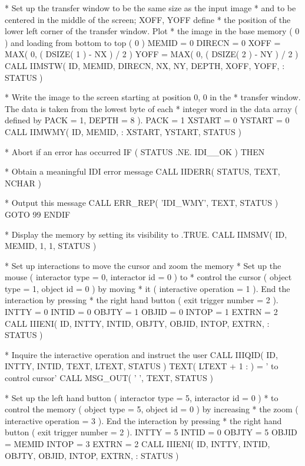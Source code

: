 \documentclass[11pt,nolof]{starlink}
\begin{document}
\begin{small}
\begin{terminalv}
*   Set up the transfer window to be the same size as the input image
*   and to be centered in the middle of the screen; XOFF, YOFF define
*   the position of the lower left corner of the transfer window. Plot
*   the image in the base memory ( 0 ) and loading from bottom to top ( 0 )
      MEMID = 0
      DIRECN = 0
      XOFF = MAX( 0, ( DSIZE( 1 ) - NX ) / 2 )
      YOFF = MAX( 0, ( DSIZE( 2 ) - NY ) / 2 )
      CALL IIMSTW( ID, MEMID, DIRECN, NX, NY, DEPTH, XOFF, YOFF,
     :             STATUS )

*   Write the image to the screen starting at position 0, 0 in the
*   transfer window. The data is taken from the lowest byte of each
*   integer word in the data array ( defined by PACK = 1, DEPTH = 8 ).
      PACK = 1
      XSTART = 0
      YSTART = 0
      CALL IIMWMY( ID, MEMID, %
     :             XSTART, YSTART, STATUS )

*   Abort if an error has occurred
      IF ( STATUS .NE. IDI__OK ) THEN

*   Obtain a meaningful IDI error message
         CALL IIDERR( STATUS, TEXT, NCHAR )

*   Output this message
         CALL ERR_REP( 'IDI_WMY', TEXT, STATUS )
         GOTO 99
      ENDIF

*   Display the memory by setting its visibility to .TRUE.
      CALL IIMSMV( ID, MEMID, 1, 1, STATUS )

*   Set up interactions to move the cursor and zoom the memory
*   Set up the mouse ( interactor type = 0, interactor id = 0 ) to
*   control the cursor ( object type = 1, object id = 0 ) by moving
*   it ( interactive operation = 1 ). End the interaction by pressing
*   the right hand button ( exit trigger number = 2 ).
      INTTY = 0
      INTID = 0
      OBJTY = 1
      OBJID = 0
      INTOP = 1
      EXTRN = 2
      CALL IIIENI( ID, INTTY, INTID, OBJTY, OBJID, INTOP, EXTRN,
     :             STATUS )

*   Inquire the interactive operation and instruct the user
      CALL IIIQID( ID, INTTY, INTID, TEXT, LTEXT, STATUS )
      TEXT( LTEXT + 1 : ) = ' to control cursor'
      CALL MSG_OUT( ' ', TEXT, STATUS )

*   Set up the left hand button ( interactor type = 5, interactor id = 0 )
*   to control the memory ( object type = 5, object id = 0 ) by increasing
*   the zoom ( interactive operation = 3 ). End the interaction by pressing
*   the right hand button ( exit trigger number = 2 ).
      INTTY = 5
      INTID = 0
      OBJTY = 5
      OBJID = MEMID
      INTOP = 3
      EXTRN = 2
      CALL IIIENI( ID, INTTY, INTID, OBJTY, OBJID, INTOP, EXTRN,
     :             STATUS )


\end{terminalv}
\end{small}
\end{document}

